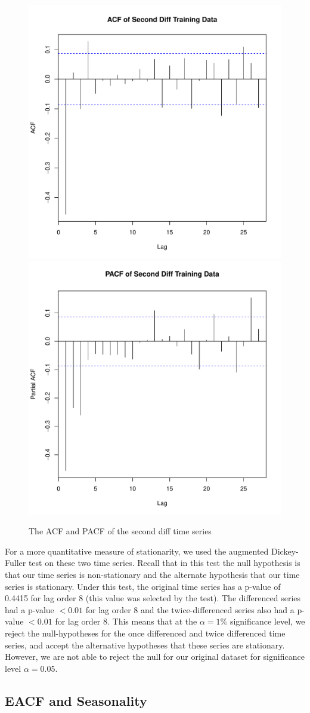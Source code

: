 \documentclass[11pt]{paper}
\begin{document}
\begin{figure}
\centering
\includegraphics[width=0.45\linewidth]{../image/acf_second_diff.pdf}
\includegraphics[width=0.45\linewidth]{../image/pacf_second_diff.pdf}
\caption{The ACF and PACF of the second diff time series}
\label{second_acf_pacf}
\end{figure}



For a more quantitative measure of stationarity, we used the augmented Dickey-Fuller test on these two time series. Recall that in this test the null hypothesis is that our time series is non-stationary and the alternate hypothesis that our time series is stationary. Under this test, the original time series has a p-value of 0.4415 for lag order 8 (this value was selected by the test). The differenced series had a p-value $< 0.01$ for lag order 8 and the twice-differenced series also had a p-value $<0.01$ for lag order 8. This means that at the $\alpha = 1\%$ significance level, we reject the null-hypotheses for the once differenced and twice differenced time series, and accept the alternative hypotheses that these series are stationary. However, we are not able to reject the null for our original dataset for significance level $\alpha=0.05$.

\subsection{EACF and Seasonality}
\end{document}
